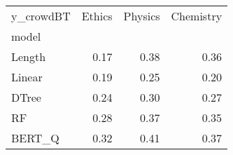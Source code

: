 \begin{tabular}{lrrr}
\toprule
y\_crowdBT &  Ethics &  Physics &  Chemistry \\
model  &         &          &            \\
\midrule
Length &    0.17 &     0.38 &       0.36 \\
Linear &    0.19 &     0.25 &       0.20 \\
DTree  &    0.24 &     0.30 &       0.27 \\
RF     &    0.28 &     0.37 &       0.35 \\
BERT\_Q &    0.32 &     0.41 &       0.37 \\
\bottomrule
\end{tabular}
